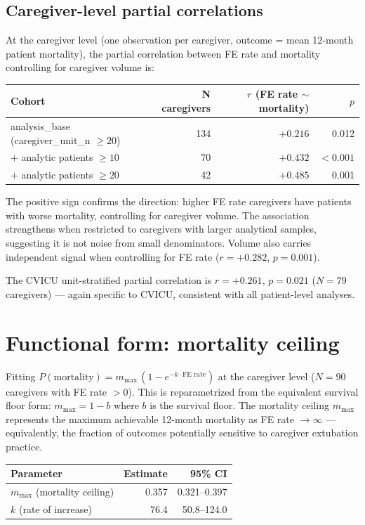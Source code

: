 \documentclass[11pt]{article}
\begin{document}
\subsection{Caregiver-level partial correlations}

At the caregiver level (one observation per caregiver, outcome = mean
12-month patient mortality), the partial correlation between FE rate and
mortality controlling for caregiver volume is:

\begin{center}
\begin{tabular}{lrrr}
\toprule
Cohort & N caregivers & $r$ (FE rate $\sim$ mortality) & $p$ \\
\midrule
analysis\_base (caregiver\_unit\_n $\geq 20$) & 134 & $+0.216$ & 0.012 \\
$+$ analytic patients $\geq 10$ & 70 & $+0.432$ & $<0.001$ \\
$+$ analytic patients $\geq 20$ & 42 & $+0.485$ & 0.001 \\
\bottomrule
\end{tabular}
\end{center}

\noindent The positive sign confirms the direction: higher FE rate caregivers
have patients with worse mortality, controlling for caregiver volume. The
association strengthens when restricted to caregivers with larger analytical
samples, suggesting it is not noise from small denominators. Volume also
carries independent signal when controlling for FE rate ($r = +0.282$,
$p = 0.001$).

\noindent The CVICU unit-stratified partial correlation is $r = +0.261$,
$p = 0.021$ ($N = 79$ caregivers) --- again specific to CVICU, consistent
with all patient-level analyses.

\section{Functional form: mortality ceiling}

Fitting $P(\text{mortality}) = m_{\max}\,(1 - e^{-k \cdot \text{FE rate}})$
at the caregiver level ($N = 90$ caregivers with FE rate $> 0$). This is
reparametrized from the equivalent survival floor form: $m_{\max} = 1 - b$
where $b$ is the survival floor. The mortality ceiling $m_{\max}$ represents
the maximum achievable 12-month mortality as FE rate $\to \infty$ ---
equivalently, the fraction of outcomes potentially sensitive to caregiver
extubation practice.

\begin{center}
\begin{tabular}{lrr}
\toprule
Parameter & Estimate & 95\% CI \\
\midrule
$m_{\max}$ (mortality ceiling) & 0.357 & 0.321--0.397 \\
$k$ (rate of increase) & 76.4 & 50.8--124.0 \\
\bottomrule
\end{tabular}
\end{center}
\end{document}
